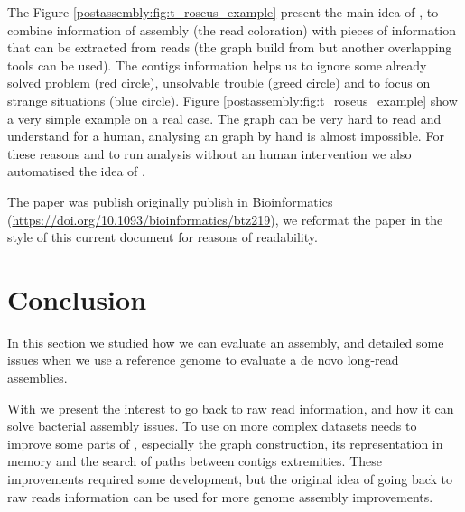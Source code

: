 \documentclass[main.tex]{subfiles}
\begin{document}
The Figure \ref{postassembly:fig:t_roseus_example} present the main idea of \knot, to combine information of assembly (the read coloration) with pieces of information that can be extracted from reads (the \OLC graph build from \minimap but another overlapping tools can be used). The   contigs information helps us to ignore some already solved problem (red circle), unsolvable trouble (greed circle) and  to focus on strange situations (blue circle). Figure \ref{postassembly:fig:t_roseus_example} show a very simple example on a real case. The \OLC graph can be very hard to read and understand for a human, analysing an \OLC graph by hand is almost impossible. For these reasons and to run analysis without an human intervention we also automatised the idea of \knot.%

The paper was publish originally publish in Bioinformatics (\url{https://doi.org/10.1093/bioinformatics/btz219}), we reformat the paper in the style of this current document for reasons of readability.



\section{Conclusion}

In this section we studied how we can evaluate an assembly, and detailed some issues when we use a reference genome to evaluate a de novo long-read assemblies.

With \knot we present the interest to go back to raw read information, and how it can solve  bacterial assembly issues.
To use \knot on more complex datasets needs to improve some parts of \knot, especially the graph construction, its representation in memory and the search of paths between contigs extremities. These improvements required some development, but the original idea of going back to raw reads information can be used for more genome assembly improvements.
\end{document}
